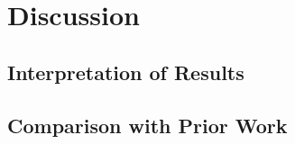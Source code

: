 \chapter{Discussion}
\label{chap:discussion}


\section{Interpretation of Results}
\label{sec:discussion_interpretation}
%
%


\section{Comparison with Prior Work}
\label{sec:discussion_prior_work}
%
%

